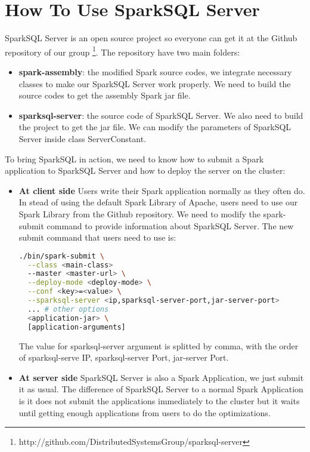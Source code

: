 
\chapter{How To Use SparkSQL Server} %

\label{AppendixA} %


SparkSQL Server is an open source project so everyone can get it at the Github repository of our group \footnote{http://github.com/DistributedSystemsGroup/sparksql-server}. The repository have two main folders:
\begin{itemize}
\item \textbf{spark-assembly}: the modified Spark source codes, we integrate necessary classes to make our SparkSQL Server work properly. We need to build the source codes to get the assembly Spark jar file.
\item \textbf{sparksql-server}: the source code of SparkSQL Server. We also need to build the project to get the jar file. We can modify the parameters of SparkSQL Server inside class ServerConstant.
\end{itemize}

To bring SparkSQL in action, we need to know how to submit a Spark application to SparkSQL Server and how to deploy the server on the cluster:
\begin{itemize}
\item \textbf{At client side} Users write their Spark application normally as they often do. In stead of using the default Spark Library of Apache, users need to use our Spark Library from the Github repository. We need to modify the spark-submit command to provide information about SparkSQL Server. The new submit command that users need to use is:\\
\begin{lstlisting}[language=bash,caption={bash version}]
./bin/spark-submit \
  --class <main-class>
  --master <master-url> \
  --deploy-mode <deploy-mode> \
  --conf <key>=<value> \
  --sparksql-server <ip,sparksql-server-port,jar-server-port>
  ... # other options
  <application-jar> \
  [application-arguments]
\end{lstlisting}
The value for sparksql-server argument is splitted by comma, with the order of sparksql-serve IP, sparksql-server Port, jar-server Port.
\item \textbf{At server side} SparkSQL Server is also a Spark Application, we just submit it as usual. The difference of SparkSQL Server to a normal Spark Application is it does not submit the applications immediately to the cluster but it waits until getting enough applications from users to do the optimizations.
\end{itemize}